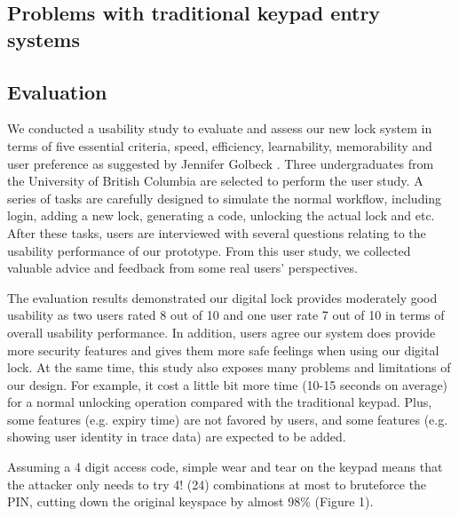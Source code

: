 \documentclass[conference]{IEEEtran}
\begin{document}
\subsection{Problems with traditional keypad entry systems}
\subsection{Evaluation}
We conducted a usability study to evaluate and assess our new lock system in terms of five essential criteria, speed, efficiency, learnability, memorability and user preference as suggested by Jennifer Golbeck \cite{JG}. Three undergraduates from the University of British Columbia are selected to perform the user study. A series of tasks are carefully designed to simulate the normal workflow, including login, adding a new lock, generating a code, unlocking the actual lock and etc. After these tasks, users are interviewed with several questions relating to the usability performance of our prototype. From this user study, we collected valuable advice and feedback from some real users’ perspectives.

The evaluation results demonstrated our digital lock provides moderately good usability as two users rated 8 out of 10 and one user rate 7 out of 10 in terms of overall usability performance. In addition, users agree our system does provide more security features and gives them more safe feelings when using our digital lock. At the same time, this study also exposes many problems and limitations of our design. For example, it cost a little bit more time (10-15 seconds on average) for a normal unlocking operation compared with the traditional keypad. Plus, some features (e.g. expiry time) are not favored by users, and some features (e.g. showing user identity in trace data) are expected to be added.


Assuming a 4 digit access code, simple wear and tear on the keypad means that the attacker only needs to try 4! (24) combinations at most to bruteforce the PIN, cutting down the original keyspace by almost 98\% (Figure 1).
\end{document}

